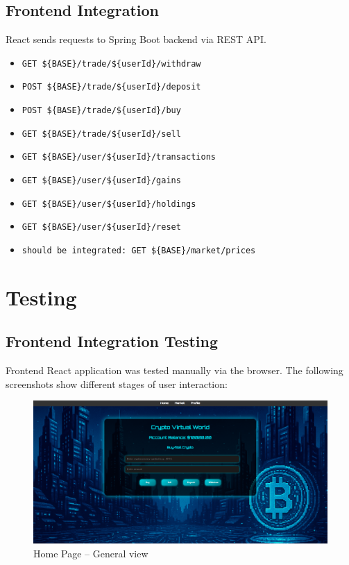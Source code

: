 \documentclass[a4paper,12pt]{article}
\begin{document}
\subsection{Frontend Integration}
React sends requests to Spring Boot backend via REST API.
\begin{itemize}
    
    \item \texttt{GET \$\{BASE\}/trade/\$\{userId\}/withdraw}
    \item \texttt{POST \$\{BASE\}/trade/\$\{userId\}/deposit}
    \item \texttt{POST \$\{BASE\}/trade/\$\{userId\}/buy}
    \item \texttt{GET \$\{BASE\}/trade/\$\{userId\}/sell}
    \item \texttt{GET \$\{BASE\}/user/\$\{userId\}/transactions}
    \item \texttt{GET \$\{BASE\}/user/\$\{userId\}/gains}
    \item \texttt{GET \$\{BASE\}/user/\$\{userId\}/holdings}
    \item \texttt{GET \$\{BASE\}/user/\$\{userId\}/reset}
    \item \texttt{should be integrated: {GET \$\{BASE\}/market/prices}}
\end{itemize}

\section{Testing}
\subsection{Frontend Integration Testing}
Frontend React application was tested manually via the browser. The following screenshots show different stages of user interaction:

\begin{figure}[H]
    \centering
    \includegraphics[width=1.0\textwidth]{homePage.png}
    \caption{Home Page – General view}
\end{figure}
\end{document}
